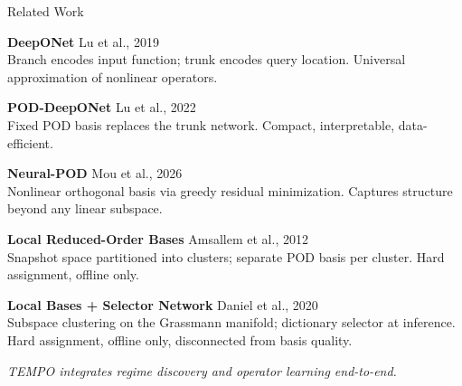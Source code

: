 \documentclass[aspectratio=169]{beamer}
\begin{document}
\begin{frame}{Related Work}

\begin{itemize}
  \setlength\itemsep{0.55em}

  \textbf{DeepONet} \hfill {\footnotesize Lu et al., 2019}\\
    {\small Branch encodes input function; trunk encodes query location.
    Universal approximation of nonlinear operators.}

   \textbf{POD-DeepONet} \hfill {\footnotesize Lu et al., 2022}\\
    {\small Fixed POD basis replaces the trunk network.
    Compact, interpretable, data-efficient.}

   \textbf{Neural-POD} \hfill {\footnotesize Mou et al., 2026}\\
    {\small Nonlinear orthogonal basis via greedy residual minimization.
    Captures structure beyond any linear subspace.}

   \textbf{Local Reduced-Order Bases} \hfill {\footnotesize Amsallem et al., 2012}\\
    {\small Snapshot space partitioned into clusters; separate POD basis
    per cluster. Hard assignment, offline only.}

   \textbf{Local Bases + Selector Network} \hfill {\footnotesize Daniel et al., 2020}\\
    {\small Subspace clustering on the Grassmann manifold; dictionary selector at inference.
    Hard assignment, offline only, disconnected from basis quality.}

\end{itemize}

\vspace{0.1cm}
{\footnotesize\textit{TEMPO integrates regime discovery and operator learning end-to-end.}}

\end{frame}
\end{document}

